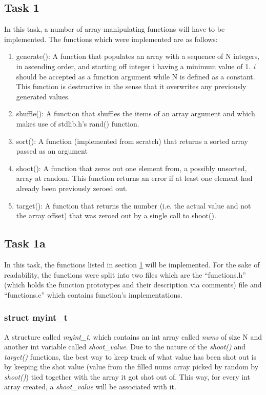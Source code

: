 \documentclass[a4paper, 12pt, titlepage]{article}
\begin{document}
\begin{onehalfspacing}
  \section{Task 1}
  \label{sec:task1}
  In this task, a number of array-manipulating functions will have to be implemented. The functions which were implemented are as follows:

  \begin{enumerate}

  \item generate(): A function that populates an array with a
      sequence of N integers, in ascending order, and starting off integer i
      having a minimum value of 1. \emph{i} should be accepted as a function
      argument while N is defined as a constant. This function is
      destructive in the sense that it overwrites any previously generated
      values.
    \item shuffle(): A function that shuffles the items of an array
      argument and which makes use of stdlib.h’s rand() function.
    \item sort(): A function (implemented from scratch) that returns a
sorted array passed as an argument
\item shoot(): A function that zeros out one element from,
  a possibly unsorted, array at random. This function returns an error
  if at least one element had already been previously zeroed out.
\item target(): A function that returns the number
  (i.e. the actual value and not the array offset) that was zeroed out
  by a single call to shoot().

  \end{enumerate}
  \pagebreak
  \subsection{Task 1a}
  In this task, the functions listed in section \ref{sec:task1} will
  be implemented. For the sake of readability, the functions were split
  into two files which are the ``functions.h'' (which holds the function
  prototypes and their description via comments) file and
  ``functions.c'' which contains function's implementations.



  \subsubsection{struct myint\_t}
  A structure called \emph{myint\_t}, which contains an int array called \emph{nums} of size N and another int variable called \emph{shoot\_value}.
  Due to the nature of the \emph{shoot()} and \emph{target()} functions, the best way to keep track of what value has been shot out is by keeping the shot value (value from the filled nums array picked by random by \emph{shoot()}) tied together with the array it got shot out of. This way, for every int array created, a \emph{shoot\_value} will be associated with it.


\end{onehalfspacing}
\end{document}
